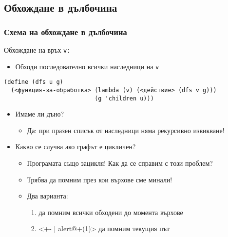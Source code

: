 \documentclass{beamer}
\begin{document}
\subsection{Обхождане в дълбочина}

\begin{frame}[fragile]
\frametitle{Схема на обхождане в дълбочина}  
  Обхождане на връх \tt v:
  \begin{itemize}
  \item Обходи последователно всички наследници на \tt v
  \end{itemize}
  \pause
\begin{verbatim}
(define (dfs u g)
  (<функция-за-обработка> (lambda (v) (<действие> (dfs v g)))
                          (g 'children u)))
\end{verbatim}
  \pause
  \begin{itemize}[<+->]
  \item \alert{Имаме ли дъно?}
    \begin{itemize}
    \item Да:  при празен списък от наследници няма рекурсивно извикване!
    \end{itemize}
  \item \alert{Какво се случва ако графът е цикличен?}
    \begin{itemize}
    \item Програмата също зацикля! Как да се справим с този проблем?
    \item Трябва да помним през кои върхове сме минали!
    \item Два варианта:
      \begin{enumerate}
      \item да помним всички обходени до момента върхове
      \item<+- | alert@+(1)> да помним текущия път
      \end{enumerate}
    \end{itemize}
  \end{itemize}
\end{frame}
\end{document}
